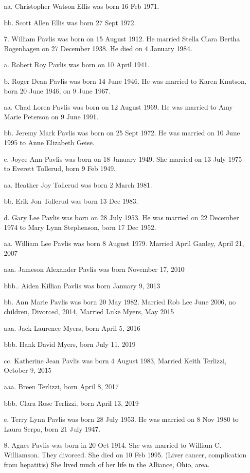 \documentclass[a4paper]{article}
\begin{document}
aa. Christopher Watson Ellis was born 16 Feb 1971.

bb. Scott Allen Ellis was born 27 Sept 1972.

7. William Pavlis was born on 15 August 1912.  He married Stella Clara Bertha Bogenhagen on 27 December 1938.  He died on 4 January 1984.

a. Robert Roy Pavlis was born on 10 April 1941. 

b. Roger Dean Pavlis was born 14 June 1946.  He was married to Karen Knutson, born 20 June 1946, on 9 June 1967.

aa.  Chad Loren Pavlis was born on 12 August 1969.  He was married to Amy Marie Peterson on 9 June 1991.

bb. Jeremy Mark Pavlis was born on 25 Sept 1972.  He was married on 10 June 1995 to Anne Elizabeth Geise.

c. Joyce Ann Pavlis was born on 18 January 1949.  She married on 13 July 1975 to Everett Tollerud, born 9 Feb 1949.  

aa. Heather Joy Tollerud was born 2 March 1981.

bb. Erik Jon Tollerud was born 13 Dec 1983.

d. Gary Lee Pavlis was born on 28 July 1953.  He was married on 22 December 1974 to Mary Lynn Stephenson, born 17 Dec 1952.

aa. William Lee Pavlis was born 8 August 1979.  Married April Ganley, April 21, 2007

aaa. Jameson Alexander Pavlis was born November 17, 2010

bbb..  Aiden Killian Pavlis was born January 9, 2013

bb. Ann Marie Pavlis was born 20 May 1982.  Married Rob Lee June 2006, no children, Divorced, 2014, Married Luke Myers, May 2015

aaa.  Jack Laurence Myers, born April 5, 2016

bbb.  Hank David Myers, born July 11, 2019

cc. Katherine Jean Pavlis was born 4 August 1983, Married Keith Terlizzi, October 9, 2015

aaa. Breen Terlizzi, born April 8, 2017

bbb. Clara Rose Terlizzi, born April 13, 2019

e. Terry Lynn Pavlis was born 28 July 1953.  He was married on 8 Nov 1980 to Laura Serpa, born 21 July 1947.  

8. Agnes Pavlis was born in 20 Oct 1914.  She was married to William C. Williamson.  They divorced.  She died on 10 Feb 1995.  (Liver cancer, complication from hepatitis)  She lived much of her life in the Alliance, Ohio, area.
\end{document}
